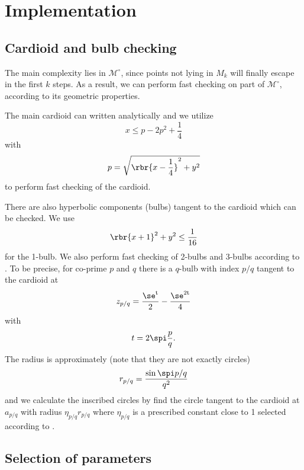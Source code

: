 \documentclass[english, nochinese]{pnote}
\begin{document}
\section{Implementation}

\subsection{Cardioid and bulb checking}

The main complexity lies in $\mathcal{M}^{\circ}$, since points not lying in $M_k$ will finally escape in the first $k$ steps. As a result, we can perform fast checking on part of $\mathcal{M}^{\circ}$, according to its geometric properties.

The main cardioid can written analytically and we utilize
\begin{equation}
x \le p - 2 p^2 + \frac{1}{4}
\end{equation}
with
\begin{equation}
p = \sqrt{ \rbr{ x - \frac{1}{4} }^2 + y^2 }
\end{equation}
to perform fast checking of the cardioid.

There are also hyperbolic components (bulbs) tangent to the cardioid which can be checked. We use
\begin{equation}
\rbr{ x + 1 }^2 + y^2 \le \frac{1}{16}
\end{equation}
for the 1-bulb. We also perform fast checking of 2-bulbs and 3-bulbs according to \parencite{linas_vepstas_mandelbrot_nodate}. To be precise, for co-prime $p$ and $q$ there is a $q$-bulb with index $ p / q $ tangent to the cardioid at
\begin{equation}
z_{ p / q } = \frac{\se^{ \si t }}{2} - \frac{\se^{ 2 \si t }}{4}
\end{equation}
with
\begin{equation}
t = 2 \spi \frac{p}{q}.
\end{equation}
The radius is approximately (note that they are not exactly circles)
\begin{equation}
r_{ p / q } = \frac{ \sin \spi p / q }{q^2}
\end{equation}
and we calculate the inscribed circles by find the circle tangent to the cardioid at $ a_{ p / q } $ with radius $ \eta_{ p / q } r_{ p / q } $ where $ \eta_{ p / q } $ is a prescribed constant close to 1 selected according to \parencite{linas_vepstas_mandelbrot_nodate}.

\subsection{Selection of parameters}
\end{document}

